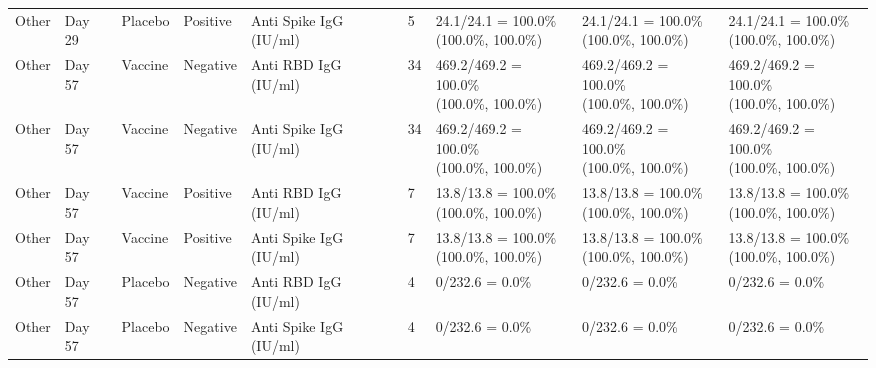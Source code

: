 \documentclass[]{book}
\theoremstyle{definition}
\theoremstyle{definition}
\theoremstyle{definition}
\newcommand{\1}{\mathbbm{1}}
\begin{document}
\begin{landscape}
\begin{ThreePartTable}
\begin{longtable}[t]{>{\raggedright\arraybackslash}p{2.7cm}llllllll}
\hspace{1em}Other & Day 29 & Placebo & Positive & Anti Spike IgG (IU/ml) & 5 & \makecell[l]{24.1/24.1 = 100.0\%\\(100.0\%, 100.0\%)} & \makecell[l]{24.1/24.1 = 100.0\%\\(100.0\%, 100.0\%)} & \makecell[l]{24.1/24.1 = 100.0\%\\(100.0\%, 100.0\%)}\\
\hspace{1em}Other & Day 57 & Vaccine & Negative & Anti RBD IgG (IU/ml) & 34 & \makecell[l]{469.2/469.2 = 100.0\%\\(100.0\%, 100.0\%)} & \makecell[l]{469.2/469.2 = 100.0\%\\(100.0\%, 100.0\%)} & \makecell[l]{469.2/469.2 = 100.0\%\\(100.0\%, 100.0\%)}\\
\hspace{1em}Other & Day 57 & Vaccine & Negative & Anti Spike IgG (IU/ml) & 34 & \makecell[l]{469.2/469.2 = 100.0\%\\(100.0\%, 100.0\%)} & \makecell[l]{469.2/469.2 = 100.0\%\\(100.0\%, 100.0\%)} & \makecell[l]{469.2/469.2 = 100.0\%\\(100.0\%, 100.0\%)}\\
\hspace{1em}Other & Day 57 & Vaccine & Positive & Anti RBD IgG (IU/ml) & 7 & \makecell[l]{13.8/13.8 = 100.0\%\\(100.0\%, 100.0\%)} & \makecell[l]{13.8/13.8 = 100.0\%\\(100.0\%, 100.0\%)} & \makecell[l]{13.8/13.8 = 100.0\%\\(100.0\%, 100.0\%)}\\
\hspace{1em}Other & Day 57 & Vaccine & Positive & Anti Spike IgG (IU/ml) & 7 & \makecell[l]{13.8/13.8 = 100.0\%\\(100.0\%, 100.0\%)} & \makecell[l]{13.8/13.8 = 100.0\%\\(100.0\%, 100.0\%)} & \makecell[l]{13.8/13.8 = 100.0\%\\(100.0\%, 100.0\%)}\\
\hspace{1em}Other & Day 57 & Placebo & Negative & Anti RBD IgG (IU/ml) & 4 & 0/232.6 = 0.0\% & 0/232.6 = 0.0\% & 0/232.6 = 0.0\%\\
\hspace{1em}Other & Day 57 & Placebo & Negative & Anti Spike IgG (IU/ml) & 4 & 0/232.6 = 0.0\% & 0/232.6 = 0.0\% & 0/232.6 = 0.0\%\\

\end{longtable}
\end{ThreePartTable}
\end{landscape}
\end{document}
